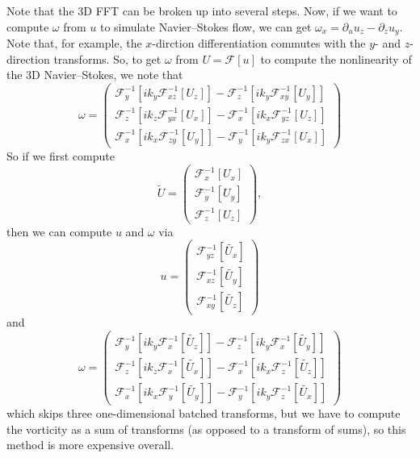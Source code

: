 \documentclass[12pt]{article}
\renewcommand{\(}{\left(}
\renewcommand{\)}{\right)}
\begin{document}
Note that the 3D FFT can be broken up into several steps.  Now, if we
want to compute $\omega$ from $u$ to simulate Navier--Stokes flow, we
can get $\omega_x=\partial_uu_z-\partial_zu_y$.  Note that, for
example, the $x$-dirction differentiation commutes with the $y$- and
$z$-direction transforms.  So, to get $\omega$ from
$U=\mathcal{F}\left[u\right]$ to compute the nonlinearity of the 3D
Navier--Stokes, we note that
\begin{dmath}
  \omega
  =
  \(
  \begin{matrix}
    \mathcal{F}_{y}^{-1}\left[ik_y \mathcal{F}_{xz}^{-1}\left[U_z\right]\right]
    -
    \mathcal{F}_{z}^{-1}\left[ik_y \mathcal{F}_{xy}^{-1}\left[U_y\right]\right]
    \\
    \mathcal{F}_{z}^{-1}\left[ik_z \mathcal{F}_{yx}^{-1}\left[U_x\right]\right]
    -
    \mathcal{F}_{x}^{-1}\left[ik_x \mathcal{F}_{yz}^{-1}\left[U_z\right]\right]
    \\
    \mathcal{F}_{x}^{-1}\left[ik_x \mathcal{F}_{zy}^{-1}\left[U_y\right]\right]
    -
    \mathcal{F}_{y}^{-1}\left[ik_y \mathcal{F}_{zx}^{-1}\left[U_x\right]\right]
  \end{matrix}
  \)
\end{dmath}
So if we first compute
\begin{dmath}
  \tilde{U}
  =
  \(
  \begin{matrix}
    \mathcal{F}_x^{-1}\left[U_x\right]\\
    \mathcal{F}_y^{-1}\left[U_y\right]\\
    \mathcal{F}_z^{-1}\left[U_z\right]
  \end{matrix}
  \),
\end{dmath}
then we can compute $u$ and $\omega$ via
\begin{dmath}
  u
  =
  \(
  \begin{matrix}
    \mathcal{F}_{yz}^{-1}\left[\tilde{U_x}\right]\\
    \mathcal{F}_{xz}^{-1}\left[\tilde{U_y}\right]\\
    \mathcal{F}_{xy}^{-1}\left[\tilde{U_z}\right]
  \end{matrix}
  \)
\end{dmath}
and
\begin{dmath}
  \omega
  =
  \(
  \begin{matrix}
    \mathcal{F}_{y}^{-1}\left[ik_y \mathcal{F}_{x}^{-1}\left[\tilde{U_z}\right]\right]
    -
    \mathcal{F}_{z}^{-1}\left[ik_y \mathcal{F}_{x}^{-1}\left[\tilde{U_y}\right]\right]
    \\
    \mathcal{F}_{z}^{-1}\left[ik_z \mathcal{F}_{x}^{-1}\left[\tilde{U_x}\right]\right]
    -
    \mathcal{F}_{x}^{-1}\left[ik_x \mathcal{F}_{z}^{-1}\left[\tilde{U_z}\right]\right]
    \\
    \mathcal{F}_{x}^{-1}\left[ik_x \mathcal{F}_{y}^{-1}\left[\tilde{U_y}\right]\right]
    -
    \mathcal{F}_{y}^{-1}\left[ik_y \mathcal{F}_{z}^{-1}\left[\tilde{U_x}\right]\right]
  \end{matrix}
  \)
\end{dmath}
which skips three one-dimensional batched transforms, but we have to
compute the vorticity as a sum of transforms (as opposed to a
transform of sums), so this method is more expensive overall.
\end{document}
